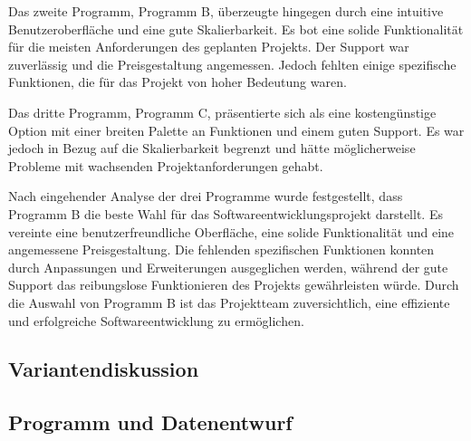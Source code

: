 Das zweite Programm, Programm B, überzeugte hingegen durch eine intuitive Benutzeroberfläche und eine gute Skalierbarkeit. Es bot eine solide Funktionalität für die meisten Anforderungen des geplanten Projekts. Der Support war zuverlässig und die Preisgestaltung angemessen. Jedoch fehlten einige spezifische Funktionen, die für das Projekt von hoher Bedeutung waren.

Das dritte Programm, Programm C, präsentierte sich als eine kostengünstige Option mit einer breiten Palette an Funktionen und einem guten Support. Es war jedoch in Bezug auf die Skalierbarkeit begrenzt und hätte möglicherweise Probleme mit wachsenden Projektanforderungen gehabt.

Nach eingehender Analyse der drei Programme wurde festgestellt, dass Programm B die beste Wahl für das Softwareentwicklungsprojekt darstellt. Es vereinte eine benutzerfreundliche Oberfläche, eine solide Funktionalität und eine angemessene Preisgestaltung. Die fehlenden spezifischen Funktionen konnten durch Anpassungen und Erweiterungen ausgeglichen werden, während der gute Support das reibungslose Funktionieren des Projekts gewährleisten würde. Durch die Auswahl von Programm B ist das Projektteam zuversichtlich, eine effiziente und erfolgreiche Softwareentwicklung zu ermöglichen.


\subsection{Variantendiskussion}
\label{sec:Marktrecherche}

\subsection{Programm und Datenentwurf}
\label{sec:ProgrammUDatenentwurf}